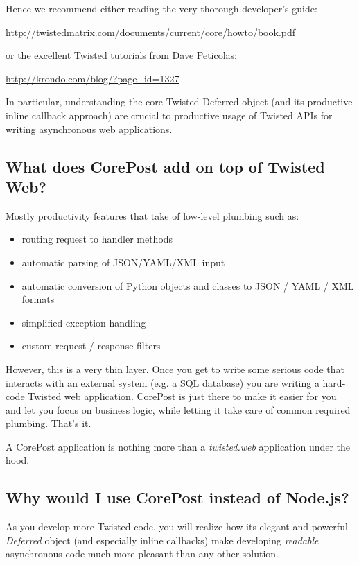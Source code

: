 \documentclass[letterpaper,10pt,english]{sphinxmanual}
\begin{document}
Hence we recommend either reading the very thorough developer's guide:

\href{http://twistedmatrix.com/documents/current/core/howto/book.pdf}{http://twistedmatrix.com/documents/current/core/howto/book.pdf}

or the excellent Twisted tutorials from Dave Peticolas:

\href{http://krondo.com/blog/?page\_id=1327}{http://krondo.com/blog/?page\_id=1327}

In particular, understanding the core Twisted Deferred object (and its productive inline callback approach) are crucial
to productive usage of Twisted APIs for writing asynchronous web applications.


\subsection{What does CorePost add on top of Twisted Web?}
\label{intro:what-does-corepost-add-on-top-of-twisted-web}
Mostly productivity features that take of low-level plumbing such as:
\begin{itemize}
\item {} 
routing request to handler methods

\item {} 
automatic parsing of JSON/YAML/XML input

\item {} 
automatic conversion of Python objects and classes to JSON / YAML / XML formats

\item {} 
simplified exception handling

\item {} 
custom request / response filters

\end{itemize}

However, this is a very thin layer. Once you get to write some serious code that interacts with an external system (e.g. a SQL database)
you are writing a hard-code Twisted web application. CorePost is just there to make it easier for you and let you focus on business logic,
while letting it take care of common required plumbing. That's it.

A CorePost application is nothing more than a \emph{twisted.web} application under the hood.


\subsection{Why would I use CorePost instead of Node.js?}
\label{intro:why-would-i-use-corepost-instead-of-node-js}
As you develop more Twisted code, you will realize how its elegant and powerful \emph{Deferred} object
(and especially inline callbacks) make developing \emph{readable} asynchronous code much more pleasant than any other solution.
\end{document}
